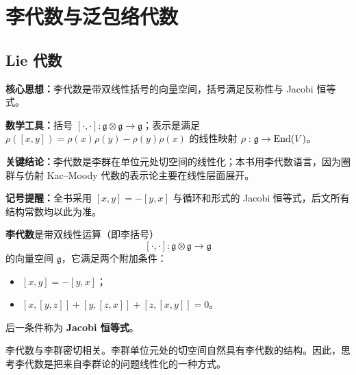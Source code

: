 
\chapter{李代数与泛包络代数}

\section{Lie 代数}

\begin{keypoints}
    \item \textbf{核心思想：}李代数是带双线性括号的向量空间，括号满足反称性与 Jacobi 恒等式。
    \item \textbf{数学工具：}括号 $[\cdot,\cdot]:\mathfrak g\otimes\mathfrak g\to\mathfrak g$；表示是满足 $\rho([x,y])=\rho(x)\rho(y)-\rho(y)\rho(x)$ 的线性映射 $\rho:\mathfrak g\to\operatorname{End}(V)$。
    \item \textbf{关键结论：}李代数是李群在单位元处切空间的线性化；本书用李代数语言，因为圈群与仿射 Kac--Moody 代数的表示论主要在线性层面展开。
    \item \textbf{记号提醒：}全书采用 $[x,y]=-[y,x]$ 与循环和形式的 Jacobi 恒等式，后文所有结构常数均以此为准。
\end{keypoints}


\textbf{李代数}是带双线性运算（即李括号）
\[
    [\cdot,\cdot]:\mathfrak g\otimes\mathfrak g\to\mathfrak g
\]
的向量空间 $\mathfrak g$，它满足两个附加条件：
\begin{itemize}
    \item $[x,y]=-[y,x]$；
    \item $[x,[y,z]]+[y,[z,x]]+[z,[x,y]]=0$。
\end{itemize}
后一条件称为 \textbf{Jacobi 恒等式}。


李代数与李群密切相关。李群单位元处的切空间自然具有李代数的结构。因此，思考李代数是把来自李群论的问题线性化的一种方式。

